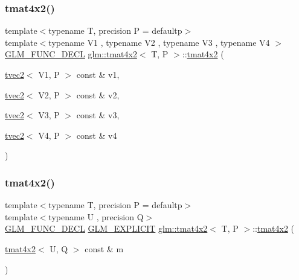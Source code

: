 \mbox{\label{structglm_1_1tmat4x2_a7cd1e8f9db551f8fd8e813c19896349f}} 
\subsubsection{\texorpdfstring{tmat4x2()}{tmat4x2()}\hspace{0.1cm}{\footnotesize\ttfamily [9/22]}}
{\footnotesize\ttfamily template$<$typename T, precision P = defaultp$>$ \\
template$<$typename V1 , typename V2 , typename V3 , typename V4 $>$ \\
\mbox{\hyperlink{setup_8hpp_ab2d052de21a70539923e9bcbf6e83a51}{G\+L\+M\+\_\+\+F\+U\+N\+C\+\_\+\+D\+E\+CL}} \mbox{\hyperlink{structglm_1_1tmat4x2}{glm\+::tmat4x2}}$<$ T, P $>$\+::\mbox{\hyperlink{structglm_1_1tmat4x2}{tmat4x2}} (\begin{DoxyParamCaption}\item[{\mbox{\hyperlink{structglm_1_1tvec2}{tvec2}}$<$ V1, P $>$ const \&}]{v1,  }\item[{\mbox{\hyperlink{structglm_1_1tvec2}{tvec2}}$<$ V2, P $>$ const \&}]{v2,  }\item[{\mbox{\hyperlink{structglm_1_1tvec2}{tvec2}}$<$ V3, P $>$ const \&}]{v3,  }\item[{\mbox{\hyperlink{structglm_1_1tvec2}{tvec2}}$<$ V4, P $>$ const \&}]{v4 }\end{DoxyParamCaption})}

\mbox{\label{structglm_1_1tmat4x2_a23ca50837bdbc3d1d47bd7010bdb7fa3}} 
\subsubsection{\texorpdfstring{tmat4x2()}{tmat4x2()}\hspace{0.1cm}{\footnotesize\ttfamily [10/22]}}
{\footnotesize\ttfamily template$<$typename T, precision P = defaultp$>$ \\
template$<$typename U , precision Q$>$ \\
\mbox{\hyperlink{setup_8hpp_ab2d052de21a70539923e9bcbf6e83a51}{G\+L\+M\+\_\+\+F\+U\+N\+C\+\_\+\+D\+E\+CL}} \mbox{\hyperlink{setup_8hpp_a6c74f5a5e7b134ab69023ff9a30d4d5d}{G\+L\+M\+\_\+\+E\+X\+P\+L\+I\+C\+IT}} \mbox{\hyperlink{structglm_1_1tmat4x2}{glm\+::tmat4x2}}$<$ T, P $>$\+::\mbox{\hyperlink{structglm_1_1tmat4x2}{tmat4x2}} (\begin{DoxyParamCaption}\item[{\mbox{\hyperlink{structglm_1_1tmat4x2}{tmat4x2}}$<$ U, Q $>$ const \&}]{m }\end{DoxyParamCaption})}

